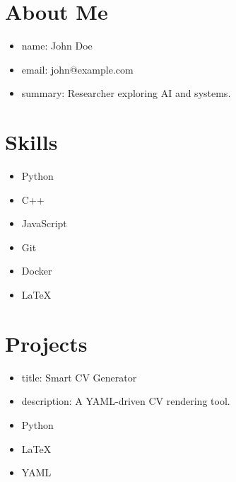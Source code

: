 \documentclass{article}%
\begin{document}
%
\normalsize%
\section{About Me}%
\label{sec:AboutMe}%
\begin{itemize}%
\item%
name: John Doe%
\end{itemize}%
\begin{itemize}%
\item%
email: john@example.com%
\end{itemize}%
\begin{itemize}%
\item%
summary: Researcher exploring AI and systems.%
\end{itemize}

%
\section{Skills}%
\label{sec:Skills}%
\begin{itemize}%
\item%
Python%
\item%
C++%
\item%
JavaScript%
\end{itemize}%
\begin{itemize}%
\item%
Git%
\item%
Docker%
\item%
LaTeX%
\end{itemize}

%
\section{Projects}%
\label{sec:Projects}%
\begin{itemize}%
\item%
title: Smart CV Generator%
\item%
description: A YAML{-}driven CV rendering tool.%
\item%
Python%
\item%
LaTeX%
\item%
YAML%
\end{itemize}

%
\end{document}
